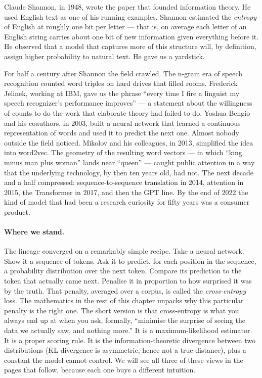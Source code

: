 Claude Shannon, in 1948, wrote the paper that founded information
theory. He used English text as one of his running examples.
Shannon estimated the \emph{entropy} of English at roughly one bit per
letter --- that is, on average each letter of an English string
carries about one bit of new information given everything before
it. He observed that a model that captures more of this structure
will, by definition, assign higher probability to natural text. He
gave us a yardstick.

For half a century after Shannon the field crawled. The n-gram
era of speech recognition counted word triples on hard drives
that filled rooms. Frederick Jelinek, working at IBM, gave us the
phrase ``every time I fire a linguist my speech recognizer's
performance improves'' --- a statement about the willingness of
counts to do the work that elaborate theory had failed to do.
Yoshua Bengio and his coauthors, in 2003, built a neural network
that learned a continuous representation of words and used it to
predict the next one. Almost nobody outside the field noticed.
Mikolov and his colleagues, in 2013, simplified the idea into
word2vec. The geometry of the resulting word vectors --- in which
``king minus man plus woman'' lands near ``queen'' --- caught
public attention in a way that the underlying technology, by then
ten years old, had not. The next decade and a half compressed:
sequence-to-sequence translation in 2014, attention in 2015, the
Transformer in 2017, and then the GPT line. By the end of 2022
the kind of model that had been a research curiosity for fifty
years was a consumer product.

\paragraph{Where we stand.} The lineage converged on a remarkably
simple recipe. Take a neural network. Show it a sequence of
tokens. Ask it to predict, for each position in the sequence, a
probability distribution over the next token. Compare its
prediction to the token that actually came next. Penalise it in
proportion to how surprised it was by the truth. That penalty,
averaged over a corpus, is called the \emph{cross-entropy} loss.
The mathematics in the rest of this chapter unpacks why this
particular penalty is the right one. The short version is that
cross-entropy is what you always end up at when you ask, formally,
``minimise the surprise of seeing the data we actually saw, and
nothing more.'' It is a maximum-likelihood estimator. It is a
proper scoring rule. It is the information-theoretic divergence
between two distributions (KL divergence is asymmetric, hence not a
true distance), plus a constant the model cannot control. We will see all three of these views in the pages that
follow, because each one buys a different intuition.

